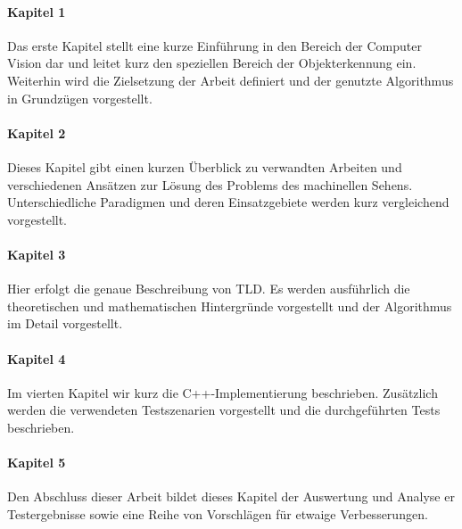 \paragraph{Kapitel 1}
Das erste Kapitel stellt eine kurze Einführung in den Bereich der Computer Vision dar und leitet kurz den speziellen Bereich der Objekterkennung ein. Weiterhin wird die Zielsetzung der Arbeit definiert und der genutzte Algorithmus in Grundzügen vorgestellt.

\paragraph{Kapitel 2}
Dieses Kapitel gibt einen kurzen Überblick zu verwandten Arbeiten
und verschiedenen Ansätzen zur Lösung des Problems des machinellen Sehens. Unterschiedliche Paradigmen und deren Einsatzgebiete werden kurz vergleichend vorgestellt.


\paragraph{Kapitel 3 }
Hier erfolgt die genaue Beschreibung von TLD. Es werden ausführlich die theoretischen und mathematischen Hintergründe vorgestellt und der Algorithmus im Detail vorgestellt.

\paragraph{Kapitel 4}
Im vierten Kapitel wir kurz die C++-Implementierung beschrieben. Zusätzlich werden die verwendeten Testszenarien vorgestellt und die durchgeführten Tests beschrieben.

\paragraph{Kapitel 5}
Den Abschluss dieser Arbeit bildet dieses Kapitel der Auswertung und Analyse er Testergebnisse sowie eine Reihe von Vorschlägen für etwaige Verbesserungen.
